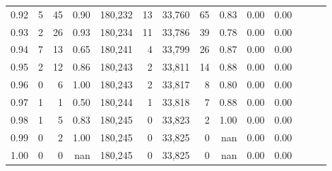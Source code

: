 \begin{tabular}{rrrrrrrrrrrrrr}
0.92 &       5 &   45 &  0.90 &  180,232 &       13 &  33,760 &      65 &  0.83 &  0.00 &      0.00 \\
0.93 &       2 &   26 &  0.93 &  180,234 &       11 &  33,786 &      39 &  0.78 &  0.00 &      0.00 \\
0.94 &       7 &   13 &  0.65 &  180,241 &        4 &  33,799 &      26 &  0.87 &  0.00 &      0.00 \\
0.95 &       2 &   12 &  0.86 &  180,243 &        2 &  33,811 &      14 &  0.88 &  0.00 &      0.00 \\
0.96 &       0 &    6 &  1.00 &  180,243 &        2 &  33,817 &       8 &  0.80 &  0.00 &      0.00 \\
0.97 &       1 &    1 &  0.50 &  180,244 &        1 &  33,818 &       7 &  0.88 &  0.00 &      0.00 \\
0.98 &       1 &    5 &  0.83 &  180,245 &        0 &  33,823 &       2 &  1.00 &  0.00 &      0.00 \\
0.99 &       0 &    2 &  1.00 &  180,245 &        0 &  33,825 &       0 &   nan &  0.00 &      0.00 \\
1.00 &       0 &    0 &   nan &  180,245 &        0 &  33,825 &       0 &   nan &  0.00 &      0.00 \\
\bottomrule
\end{tabular}
